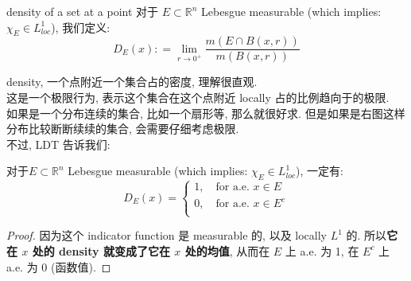 \documentclass[lang=cn,11pt]{elegantbook}
\begin{document}
\begin{definition}{density of a set at a point}
    对于 $E\subset \mathbb{R}^n$ Lebesgue measurable (which implies: $\chi_E \in L^1_{loc}$), 我们定义: \[
    D_E(x) : = \lim_{r\to 0^+} \frac{m(E \cap B(x,r))}{m(B(x,r))} 
    \]
\end{definition}
\begin{remark}
    density, 一个点附近一个集合占的密度, 理解很直观.\\
    这是一个极限行为, 表示这个集合在这个点附近 locally 占的比例趋向于的极限.\\
如果是一个分布连续的集合, 比如一个扇形等, 那么就很好求. 但是如果是右图这样分布比较断断续续的集合, 会需要仔细考虑极限.\\
不过, LDT 告诉我们:
\end{remark}
\begin{corollary}
对于$E\subset \mathbb{R}^n$ Lebesgue measurable (which implies: $\chi_E \in L^1_{loc}$), 一定有: \[
    D_E(x) = \begin{cases}
        1,\quad \text{for a.e. } x\in E\\
        0, \quad \text{for a.e. } x\in E^c\\
    \end{cases}
    \]
\end{corollary}\begin{proof}
        因为这个 indicator function 是 measurable 的, 以及 locally $L^1$ 的. 所以\textbf{它在 $x$ 处的 density 就变成了它在 $x$ 处的均值}, 从而在 $E$ 上 a.e. 为 1, 在 $E^c$ 上 a.e. 为 0 (函数值).\end{proof}
\end{document}
